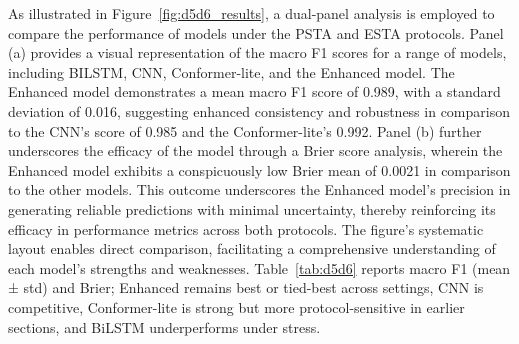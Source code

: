 \documentclass[journal]{IEEEtran}
\begin{document}
 
As illustrated in Figure~\ref{fig:d5d6_results}, a dual-panel analysis is employed to compare the performance of models under the PSTA and ESTA protocols. Panel (a) provides a visual representation of the macro F1 scores for a range of models, including BILSTM, CNN, Conformer-lite, and the Enhanced model. The Enhanced model demonstrates a mean macro F1 score of 0.989, with a standard deviation of 0.016, suggesting enhanced consistency and robustness in comparison to the CNN's score of 0.985 and the Conformer-lite's 0.992. Panel (b) further underscores the efficacy of the model through a Brier score analysis, wherein the Enhanced model exhibits a conspicuously low Brier mean of 0.0021 in comparison to the other models. This outcome underscores the Enhanced model's precision in generating reliable predictions with minimal uncertainty, thereby reinforcing its efficacy in performance metrics across both protocols. The figure's systematic layout enables direct comparison, facilitating a comprehensive understanding of each model's strengths and weaknesses.
Table~\ref{tab:d5d6} reports macro F1 (mean ± std) and Brier; Enhanced remains best or tied-best across settings, CNN is competitive, Conformer-lite is strong but more protocol-sensitive in earlier sections, and BiLSTM underperforms under stress.
\end{document}
